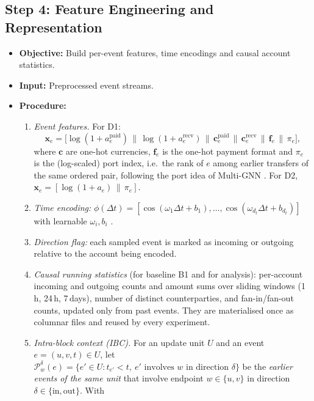 \documentclass[11pt,a4paper]{article}
\begin{document}
\subsection{Step 4: Feature Engineering and Representation}
\begin{itemize}[leftmargin=*]
    \item \textbf{Objective:} Build per-event features, time encodings and causal account statistics.
    \item \textbf{Input:} Preprocessed event streams.
    \item \textbf{Procedure:}
    \begin{enumerate}[leftmargin=*]
        \item \textit{Event features.} For D1:
        \begin{equation}
            \mathbf{x}_e = \big[\log(1+a^{\text{paid}}_e) \,\|\, \log(1+a^{\text{recv}}_e) \,\|\, \mathbf{c}^{\text{paid}}_e \,\|\, \mathbf{c}^{\text{recv}}_e \,\|\, \mathbf{f}_e \,\|\, \pi_e\big],
        \end{equation}
        where $\mathbf{c}$ are one-hot currencies, $\mathbf{f}_e$ is the one-hot payment format and $\pi_e$ is the (log-scaled) port index, i.e.\ the rank of $e$ among earlier transfers of the same ordered pair, following the port idea of Multi-GNN \cite{egressy2024multigraph}. For D2, $\mathbf{x}_e = [\log(1+a_e) \,\|\, \pi_e]$.
        \item \textit{Time encoding:} $\phi(\Delta t) = [\cos(\omega_1\Delta t + b_1), \dots, \cos(\omega_{d_t}\Delta t + b_{d_t})]$ with learnable $\omega_i, b_i$ \cite{xu2020tgat,rossi2020tgn}.
        \item \textit{Direction flag:} each sampled event is marked as incoming or outgoing relative to the account being encoded.
        \item \textit{Causal running statistics} (for baseline B1 and for analysis): per-account incoming and outgoing counts and amount sums over sliding windows (1\,h, 24\,h, 7\,days), number of distinct counterparties, and fan-in/fan-out counts, updated only from past events. They are materialised once as columnar files and reused by every experiment.
        \item \textit{Intra-block context (IBC).} For an update unit $U$ and an event $e=(u,v,t)\in U$, let $\mathcal{P}^{\delta}_w(e)=\{e'\in U: t_{e'}<t,\ e' \text{ involves } w \text{ in direction } \delta\}$ be the \emph{earlier events of the same unit} that involve endpoint $w\in\{u,v\}$ in direction $\delta\in\{\text{in},\text{out}\}$. With

\end{enumerate}
\end{itemize}
\end{document}
